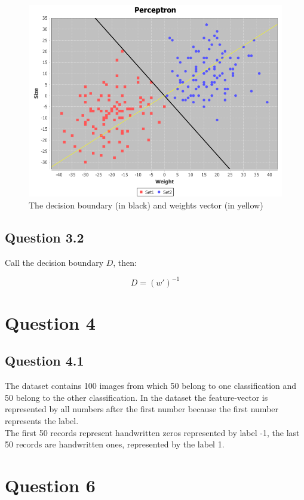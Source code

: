 \documentclass[11pt,twoside,a4paper]{article}
\begin{document}
\begin{figure}[ht]
    \centering
    \includegraphics[width=\textwidth]{perceptron.png}
    \caption{The decision boundary (in black) and weights vector (in yellow)}
\end{figure}
	
	\subsection{Question 3.2}
	Call the decision boundary $D$, then:
	
	\begin{equation}
		D = (w')^{-1}
	\end{equation}
	
\section{Question 4}

	\subsection{Question 4.1}
	The dataset contains 100 images from which 50 belong to one classification and 50 belong to the other classification. In the dataset the feature-vector is represented by all numbers after the first number because the first number represents the label. \\
	The first 50 records represent handwritten zeros represented by label -1, the last 50 records are handwritten ones, represented by the label 1.
	
\section{Question 6}
\end{document}
